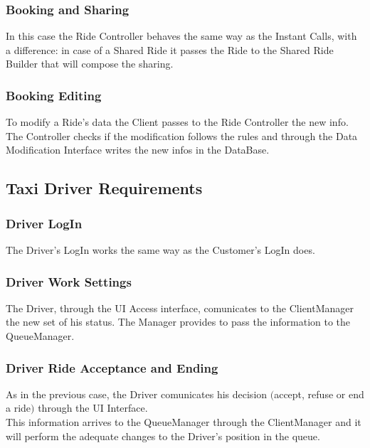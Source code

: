 		\subsubsection{Booking and Sharing}
		In this case the Ride Controller behaves the same way as the Instant Calls, with a difference: in case of a Shared Ride it passes the Ride to the Shared Ride Builder that will compose the sharing.
		
		\subsubsection{Booking Editing}
		To modify a Ride's data the Client passes to the Ride Controller the new info. The Controller checks if the modification follows the rules and through the Data Modification Interface writes the new infos in the DataBase.
		
		
	\subsection {Taxi Driver Requirements}
	
		\subsubsection{Driver LogIn}
		The Driver's LogIn works the same way as the Customer's LogIn does.
		
		\subsubsection{Driver Work Settings}
		The Driver, through the UI Access interface, comunicates to the ClientManager the new set of his status. The Manager provides to pass the information to the QueueManager.
		
		\subsubsection{Driver Ride Acceptance and Ending}
		As in the previous case, the Driver comunicates his decision $($accept, refuse or end a ride$)$ through the UI Interface. \\ This information arrives to the QueueManager through the ClientManager and it will perform the adequate changes to the Driver's position in the queue.
